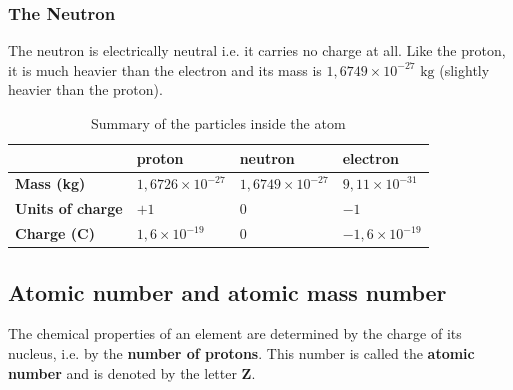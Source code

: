             \subsubsection*{The Neutron}
            \nopagebreak
          \label{m38745*id254468}The neutron is electrically neutral i.e.\@{} it carries no charge at all.
Like the proton, it is much heavier than the electron and its mass is $1,6749 \times {10}^{-27} \text{ kg}$ (slightly heavier than the proton).\par 
\label{m38745*notfhsst!!!underscore!!!id214}
          \begin{table}[H]
        \begin{center}
      \label{m38745*uid14}
    \noindent
      \begin{tabular}{|l|l|l|l|}\hline
         &
                    \textbf{proton}
                   &
                    \textbf{neutron}
                   &
                    \textbf{electron} \\ \hline
                    \textbf{Mass (kg)}
                   &
        $1,6726 \times {10}^{-27}$ &
        $1,6749 \times {10}^{-27}$ &
        $9,11 \times {10}^{-31}$ \\ \hline
                    \textbf{Units of charge}
                   &
        $+1$ &
        $0$ &
        $-1$ \\ \hline
                    \textbf{Charge (C)}
                   &
        $1,6 \times {10}^{-19}$ &
        $0$ &
        $-1,6 \times {10}^{-19}$ \\ \hline
    \end{tabular}
      \end{center}
    \caption{Summary of the particles inside the atom}
\end{table}
    \par
    \label{m38745*cid5}
            \subsection*{Atomic number and atomic mass number}
            \nopagebreak
      \label{m38745*id255805}The chemical properties of an element are determined by the charge of its nucleus, i.e.\@{} by the \textbf{number of protons}. This number is called the \textbf{atomic number} and is denoted by the letter \textbf{Z}.

